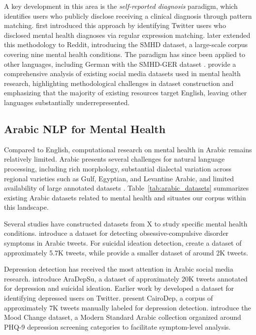 \documentclass[11pt]{article}
\begin{document}
A key development in this area is the \textit{self-reported diagnosis} paradigm,
which identifies users who publicly disclose receiving a clinical diagnosis through
pattern matching. \citet{coppersmith2014quantifying} first introduced this approach
by identifying Twitter users who disclosed mental health diagnoses via regular
expression matching. \citet{cohan-etal-2018-smhd} later extended this methodology to
Reddit, introducing the SMHD dataset, a large-scale corpus covering nine mental
health conditions. The paradigm has since been applied to other languages,
including German with the SMHD-GER dataset \cite{zanwar2023smhd}.
\citet{harrigian2021state} provide a comprehensive analysis of existing social
media datasets used in mental health research, highlighting methodological
challenges in dataset construction and emphasizing that the majority of existing
resources target English, leaving other languages substantially underrepresented.

\subsection{Arabic NLP for Mental Health}
\label{subsec:related_arabic}

Compared to English, computational research on mental health in Arabic remains
relatively limited. Arabic presents several challenges for natural language
processing, including rich morphology, substantial dialectal variation across
regional varieties such as Gulf, Egyptian, and Levantine Arabic, and limited
availability of large annotated datasets \cite{darwish2021panoramic, alayba2025arabic}.
Table~\ref{tab:arabic_datasets} summarizes existing Arabic datasets related to
mental health and situates our corpus within this landscape.

Several studies have constructed datasets from X to study specific mental health
conditions. \citet{al2024classification} introduce a dataset for detecting
obsessive-compulsive disorder symptoms in Arabic tweets. For suicidal ideation
detection, \citet{abdulsalam2024detecting} create a dataset of approximately 5.7K
tweets, while \citet{baghdadi2022optimized} provide a smaller dataset of around
2K tweets.

Depression detection has received the most attention in Arabic social media
research. \citet{hassib2022aradepsu} introduce AraDepSu, a dataset of
approximately 20K tweets annotated for depression and suicidal ideation.
Earlier work by \citet{almouzini2019detecting} developed a dataset for identifying
depressed users on Twitter. \citet{elramly2021cairodep} present CairoDep, a corpus
of approximately 7K tweets manually labeled for depression detection.
\citet{maghraby2022mood} introduce the Mood Change dataset, a Modern Standard
Arabic collection organized around PHQ-9 depression screening categories to
facilitate symptom-level analysis.
\end{document}

